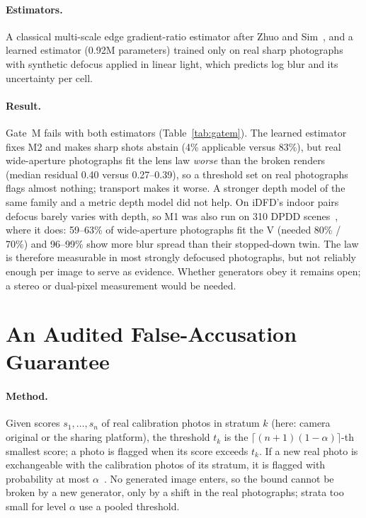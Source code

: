 \documentclass[10pt,twocolumn]{article}
\begin{document}
\paragraph{Estimators.} A classical multi-scale edge gradient-ratio estimator
after Zhuo and Sim~\cite{zhuo2011defocus}, and a learned estimator (0.92M
parameters) trained only on real sharp photographs with synthetic defocus
applied in linear light, which predicts log blur and its uncertainty per cell.



\paragraph{Result.} Gate~M fails with both estimators
(Table~\ref{tab:gatem}). The learned estimator fixes M2 and makes sharp shots
abstain (4\% applicable versus 83\%), but real wide-aperture photographs fit
the lens law \emph{worse} than the broken renders (median residual 0.40
versus 0.27--0.39), so a threshold set on real photographs flags almost
nothing; transport makes it worse. A stronger depth model of the same family
and a metric depth model did not help. On iDFD's indoor pairs defocus barely
varies with depth, so M1 was also run on 310 DPDD scenes~\cite{abuolaim2020dpdd},
where it does: 59--63\% of wide-aperture photographs fit the V (needed 80\% /
70\%) and 96--99\% show more blur spread than their stopped-down twin. The
law is therefore measurable in most strongly defocused photographs, but not
reliably enough per image to serve as evidence. Whether generators obey it remains open; a
stereo or dual-pixel measurement would be needed.

\section{An Audited False-Accusation Guarantee}
\label{sec:fpr}
\paragraph{Method.} Given scores $s_1,\dots,s_n$ of real calibration photos
in stratum $k$ (here: camera original or the sharing platform), the
threshold $t_k$ is the $\lceil (n+1)(1-\alpha)\rceil$-th smallest score; a
photo is flagged when its score exceeds $t_k$. If a new real photo is
exchangeable with the calibration photos of its stratum, it is flagged with
probability at most $\alpha$~\cite{vovk2005algorithmic}. No generated image
enters, so the bound cannot be broken by a new generator, only by a shift in
the real photographs; strata too small for level $\alpha$ use a pooled
threshold.
\end{document}
